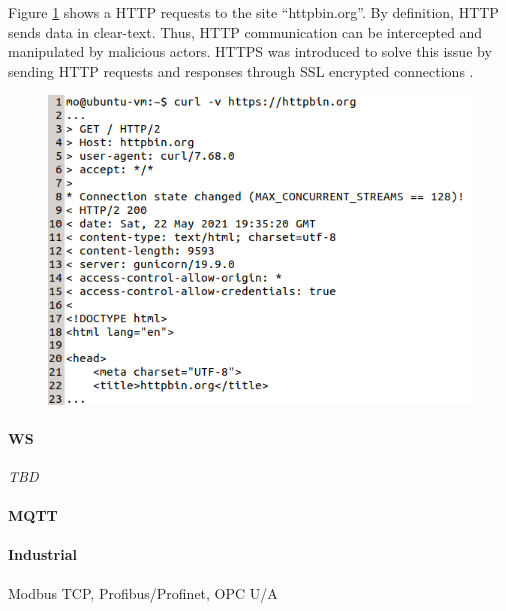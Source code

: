 Figure \ref{fig:curl-http-request-respose} shows a \ac{HTTP} requests to the site \enquote{httpbin.org}. By definition, \ac{HTTP} sends data in clear-text. Thus, \ac{HTTP} communication can be intercepted and manipulated by malicious actors. \ac{HTTPS} was introduced to solve this issue by sending \ac{HTTP} requests and responses through \ac{SSL} encrypted connections \cite{rfc2818}.

\begin{figure}[h!]
    \centering
    \includegraphics[width=12cm]{img/ch03/http-request-response.png}
    \label{fig:curl-http-request-respose}
\end{figure}

\paragraph{\ac{WS}} \emph{TBD}

\paragraph{\ac{MQTT}}
\cite{gupta_banks_2015}

\paragraph{Industrial} Modbus \ac{TCP}, Profibus/Profinet, \ac{OPC U/A}

